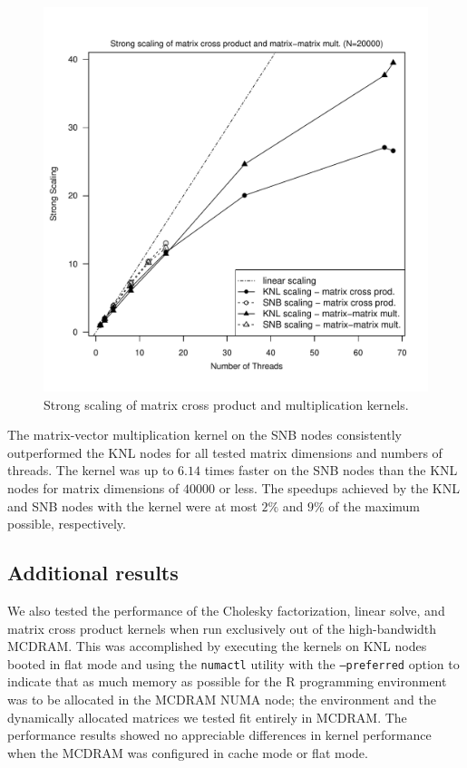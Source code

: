 \begin{figure}
\includegraphics[height=\columnwidth, width=\columnwidth]{cross_matmat_20000_68-ss.pdf}
\caption{Strong scaling of matrix cross product and multiplication kernels.}
\label{fig:crossMatmatScale}
\end{figure}

The matrix-vector multiplication kernel on the SNB nodes consistently outperformed the KNL
nodes for all tested matrix dimensions and numbers of threads. The kernel was up to $6.14$
times faster on the SNB nodes than the KNL nodes for matrix dimensions of $40000$ or less.
The speedups achieved by the KNL and SNB nodes with the kernel were at most $2\%$ and
$9\%$ of the maximum possible, respectively.

\subsection{Additional results}

We also tested the performance of the Cholesky factorization, linear solve, and matrix
cross product kernels when run exclusively out of the high-bandwidth MCDRAM. This was
accomplished by executing the kernels on KNL nodes booted in flat mode and using the
\texttt{numactl} utility with the \texttt{--preferred} option to indicate that as much
memory as possible for the R programming environment was to be allocated in the MCDRAM
NUMA node; the environment and the dynamically allocated matrices we tested fit entirely
in MCDRAM. The performance results showed no appreciable differences in kernel performance
when the MCDRAM was configured in cache mode or flat mode.

